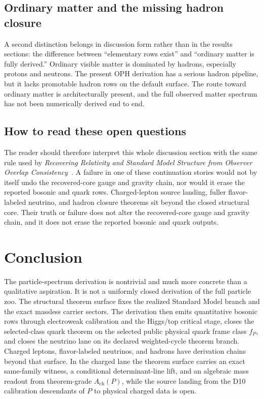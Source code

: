 \documentclass[11pt]{article}
\begin{document}
\subsection{Ordinary matter and the missing hadron closure}

A second distinction belongs in discussion form rather than in the results sections: the
difference between ``elementary rows exist'' and ``ordinary matter is fully derived.'' Ordinary
visible matter is dominated by hadrons, especially protons and neutrons. The present OPH
derivation has a serious hadron pipeline, but it lacks promotable hadron rows on the
default surface. The route toward ordinary matter is architecturally present, and the full
observed matter spectrum has not been numerically derived end to end.

\subsection{How to read these open questions}

The reader should therefore interpret this whole discussion section with the same rule used by
\emph{Recovering Relativity and Standard Model Structure from Observer Overlap Consistency}~\cite{ophcompact}. A failure in one of these continuation stories would not by itself undo the
recovered-core gauge and gravity chain, nor would it erase the reported bosonic and quark
rows. Charged-lepton source landing, fuller flavor-labeled neutrino, and hadron closure theorems sit beyond the
closed structural core. Their truth or failure does not alter the recovered-core gauge and
gravity chain, and it does not erase the reported bosonic and quark outputs.

\section{Conclusion}

The particle-spectrum derivation is nontrivial and much more concrete than a qualitative aspiration. It is
not a uniformly closed derivation of the full particle zoo. The structural theorem surface fixes
the realized Standard Model branch and the exact massless carrier sectors. The derivation
then emits quantitative bosonic rows through electroweak calibration and the Higgs/top critical
stage, closes the selected-class quark theorem on the selected public physical quark frame class \(f_P\), and
closes the neutrino lane on its declared weighted-cycle theorem branch. Charged leptons,
flavor-labeled neutrinos, and hadrons have derivation chains beyond that surface. In the charged
lane the theorem surface carries an exact same-family witness, a conditional determinant-line lift,
and an algebraic mass readout from theorem-grade \(A_{\mathrm{ch}}(P)\), while the source landing
from the D10 calibration descendants of \(P\) to physical charged data is open.
\end{document}

